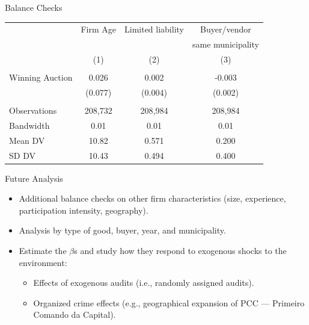 \documentclass[12pt,english,xcolor=dvipsnames,aspectratio=1610]{beamer}
\begin{document}
\begin{frame}{Balance Checks}
\begin{center}
\begin{tabular}{lccc}
\hline\hline
 & Firm Age & Limited liability & Buyer/vendor \\
 &          &                   & same municipality \\
 & (1) & (2) & (3) \\
\hline
\\[-4pt]
Winning Auction   & 0.026 & 0.002 & -0.003 \\
                  & (0.077) & (0.004) & (0.002) \\
\\[-4pt]
Observations & 208{,}732 & 208{,}984 & 208{,}984 \\
Bandwidth    & 0.01 & 0.01 & 0.01 \\
Mean DV      & 10.82 & 0.571 & 0.200 \\
SD DV        & 10.43 & 0.494 & 0.400 \\
\hline\hline
\end{tabular}
\end{center}
\end{frame}


\begin{frame}{Future Analysis}
\begin{itemize}
  \item Additional balance checks on other firm characteristics (size, experience, participation intensity, geography).
  \item Analysis by type of good, buyer, year, and municipality. \vspace{2mm}
  \item Estimate the $\beta$s and study how they respond to exogenous shocks to the environment:
  \begin{itemize}
    \item Effects of exogenous audits (i.e., randomly assigned audits).
    \item Organized crime effects (e.g., geographical expansion of PCC --- Primeiro Comando da Capital).
  \end{itemize}
\end{itemize}
\end{frame}

\end{document}
